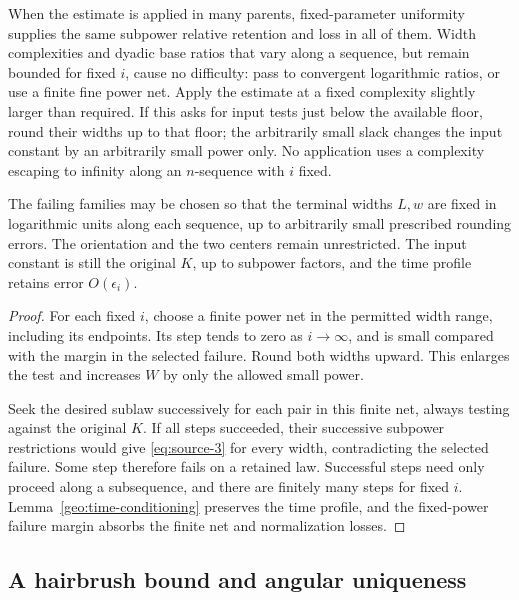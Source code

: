 When the estimate is applied in many parents, fixed-parameter
uniformity supplies the same subpower relative retention and loss
in all of them.  Width complexities and dyadic base ratios that
vary along a sequence, but remain bounded for fixed \(i\), cause
no difficulty: pass to convergent logarithmic ratios, or use a
finite fine power net.  Apply the estimate at a fixed complexity
slightly larger than required.  If this asks for input tests just
below the available floor, round their widths up to that floor;
the arbitrarily small slack changes the input constant by an
arbitrarily small power only.  No application uses a complexity
escaping to infinity along an \(n\)-sequence with \(i\) fixed.

\begin{lemma}\label{geo:fixed-widths}
The failing families may be chosen so that the terminal widths
\(L,w\) are fixed in logarithmic units along each sequence, up to
arbitrarily small prescribed rounding errors.  The orientation
and the two centers remain unrestricted.  The input constant is
still the original \(K\), up to subpower factors, and the time
profile retains error \(O(\epsilon_i)\).
\end{lemma}

\begin{proof}
For each fixed \(i\), choose a finite power net in the permitted
width range, including its endpoints.  Its step tends to zero
as \(i\to\infty\), and is small compared with the margin in the
selected failure.  Round both widths upward.  This enlarges the
test and increases \(W\) by only the allowed small power.

Seek the desired sublaw successively for each pair in this finite
net, always testing against the original \(K\).  If all steps
succeeded, their successive subpower restrictions would give
\eqref{eq:source-3} for every width, contradicting the selected
failure.  Some step therefore fails on a retained law.  Successful
steps need only proceed along a subsequence, and there are finitely
many steps for fixed \(i\).  Lemma~\ref{geo:time-conditioning}
preserves the time profile, and the fixed-power failure margin
absorbs the finite net and normalization losses.
\end{proof}

\subsection{A hairbrush bound and angular uniqueness}

